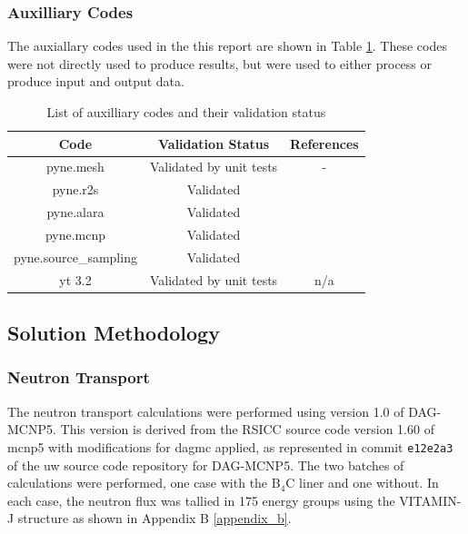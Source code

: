 \documentclass[12pt]{article}
\begin{document}
\subsubsection*{Auxilliary Codes}
The auxiallary codes used in the this report are shown in Table 
\ref{table:validation_aux}. These codes were not directly used to 
produce results, but were used to either process or produce input
and output data.
\begin{centering}
 \begin{table}[ht!]
  \begin{tabular}{c | c | c}
  \hline
  Code & Validation Status & References \\    
  \hline
  pyne.mesh & Validated by unit tests & - \\
  pyne.r2s & Validated & \cite{pyne_r2s} \\
  pyne.alara & Validated & \cite{pyne_r2s} \\
  pyne.mcnp & Validated & \cite{pyne_r2s} \\
  pyne.source\_sampling & Validated & \cite{pyne_r2s} \\
  yt 3.2 & Validated by unit tests & n/a \\
 \end{tabular}
 \caption{List of auxilliary codes and their validation status}
 \label{table:validation_aux}
 \end{table}
\end{centering}

\newpage
\subsection{Solution Methodology}
\label{section:method}
\subsubsection{Neutron Transport}
The neutron transport calculations were performed using version 1.0 of DAG-MCNP5.
This version is derived from the RSICC source code version 1.60 of \gls{mcnp5}
with modifications for \gls{dagmc} applied, as represented in commit \texttt{e12e2a3}
of the \gls{uw} source code repository for DAG-MCNP5.
The two batches of calculations were performed, one
case with the B$_4$C liner and one without.  
In each case, the neutron flux was tallied in 175 energy groups using the
VITAMIN-J structure \cite{vitaminj} as shown in Appendix B \ref{appendix_b}.

\end{document}

